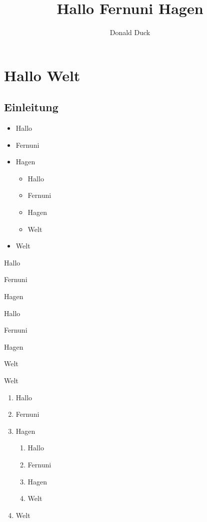 \documentclass[12pt,ngerman,parskip=half]{scrreprt}
\author{Donald Duck}
\title{Hallo Fernuni Hagen}
\begin{document}
\maketitle

\tableofcontents

\chapter{Hallo Welt}

\section{Einleitung}

\blindtext[1] 

\begin{itemize} %
\item Hallo
\item Fernuni
\item Hagen
\begin{itemize}[+]
\item Hallo
\item Fernuni
\item Hagen
\item Welt
\end{itemize}
\item Welt
\end{itemize}

\begin{compactitem}[\%] %
\item Hallo
\item Fernuni
\item Hagen
\begin{compactitem}[+]
\item Hallo
\item Fernuni
\item Hagen
\item Welt
\end{compactitem}
\item Welt
\end{compactitem}


\begin{enumerate}
\item Hallo
\item Fernuni
\item Hagen
\begin{enumerate}
\item Hallo
\item Fernuni
\item Hagen
\item Welt
\end{enumerate}
\item Welt
\end{enumerate}
\end{document}
